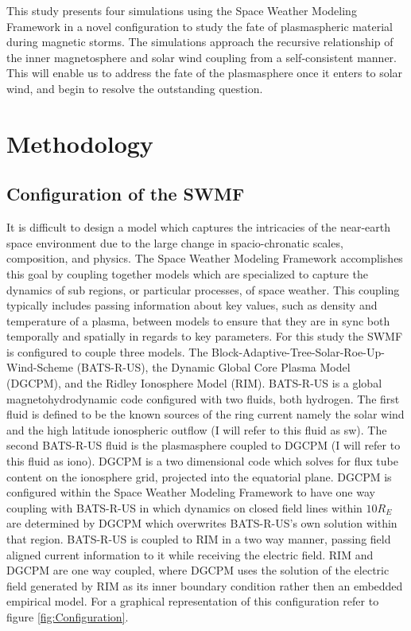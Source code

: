 \documentclass[utf8]{frontiersinFPHY_FAMS}
\begin{document}
This study presents four simulations using the Space Weather Modeling Framework in a novel configuration to study the fate of plasmaspheric material during magnetic storms. The simulations approach the recursive relationship of the inner magnetosphere and solar wind coupling from a self-consistent manner. This will enable us to address the fate of the plasmasphere once it enters to solar wind, and begin to resolve the outstanding question. 

\section{Methodology}
\subsection{Configuration of the SWMF} %
It is difficult to design a model which captures the intricacies of the near-earth space environment due to the large change in spacio-chronatic scales, composition, and physics. The Space Weather Modeling Framework \citet[Toth et al.(2005)]{Toth2005} accomplishes this goal by coupling together models which are specialized to capture the dynamics of sub regions, or particular processes, of space weather. This coupling typically includes passing information about key values, such as density and temperature of a plasma, between models to ensure that they are in sync both temporally and spatially in regards to key parameters. For this study the SWMF is configured to couple three models. The Block-Adaptive-Tree-Solar-Roe-Up-Wind-Scheme (BATS-R-US), the Dynamic Global Core Plasma Model (DGCPM), and the Ridley Ionosphere Model (RIM). BATS-R-US is a global magnetohydrodynamic code configured with two fluids, both hydrogen. The first fluid is defined to be the known sources of the ring current namely the solar wind and the high latitude ionospheric outflow (I will refer to this fluid as sw). The second BATS-R-US fluid is the plasmasphere coupled to DGCPM (I will refer to this fluid as iono). DGCPM is a two dimensional code which solves for flux tube content on the ionosphere grid, projected into the equatorial plane. DGCPM is configured within the Space Weather Modeling Framework to have one way coupling with BATS-R-US in which dynamics on closed field lines within $10 R_{E}$ are determined by DGCPM which overwrites BATS-R-US's own solution within that region. BATS-R-US is coupled to RIM in a two way manner, passing field aligned current information to it while receiving the electric field. RIM and DGCPM are one way coupled, where DGCPM uses the solution of the electric field generated by RIM as its inner boundary condition rather then an embedded empirical model. For a graphical representation of this configuration refer to figure \ref{fig:Configuration}.
\end{document}
